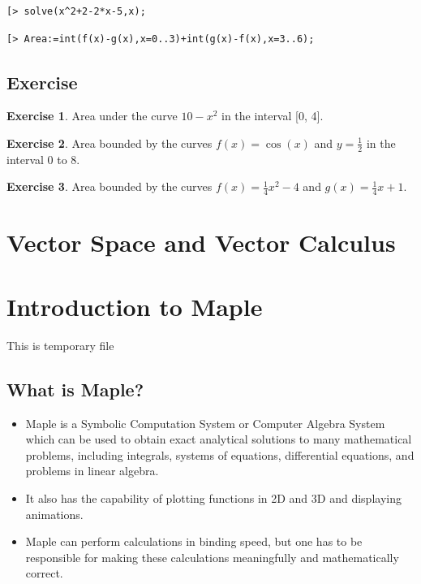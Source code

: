 \documentclass[
]{book}
\providecommand{\tightlist}{%
  \setlength{\itemsep}{0pt}\setlength{\parskip}{0pt}}
\theoremstyle{definition}
\theoremstyle{definition}
\theoremstyle{definition}
\newtheorem{exercise}{Exercise}[chapter]
\theoremstyle{definition}
\theoremstyle{remark}
\begin{document}
\begin{verbatim}
[> solve(x^2+2-2*x-5,x);
\end{verbatim}

\begin{verbatim}
[> Area:=int(f(x)-g(x),x=0..3)+int(g(x)-f(x),x=3..6);
\end{verbatim}

\section{Exercise}\label{exercise-10}

\begin{exercise}
\protect\hypertarget{exr:unnamed-chunk-58}{}\label{exr:unnamed-chunk-58}Area under the curve \(10 - x^2\) in the interval {[}0, 4{]}.
\end{exercise}

\begin{exercise}
\protect\hypertarget{exr:unnamed-chunk-59}{}\label{exr:unnamed-chunk-59}Area bounded by the curves \(f(x) = \cos(x)\) and \(y = \frac{1}{2}\) in the interval 0 to 8.
\end{exercise}

\begin{exercise}
\protect\hypertarget{exr:unnamed-chunk-60}{}\label{exr:unnamed-chunk-60}Area bounded by the curves \(f(x) = \frac{1}{4}x^2 - 4\) and \(g(x) = \frac{1}{4}x + 1\).
\end{exercise}

\chapter{Vector Space and Vector Calculus}\label{vector-space-and-vector-calculus}

\chapter{Introduction to Maple}\label{introduction-to-maple-1}

This is temporary file

\section{What is Maple?}\label{what-is-maple-1}

\begin{itemize}
\tightlist
\item
  Maple is a Symbolic Computation System or Computer Algebra System which can be used to obtain exact analytical solutions to many mathematical problems, including integrals, systems of equations, differential equations, and problems in linear algebra.
\item
  It also has the capability of plotting functions in 2D and 3D and displaying animations.
\item
  Maple can perform calculations in binding speed, but one has to be responsible for making these calculations meaningfully and mathematically correct.
\end{itemize}
\end{document}

